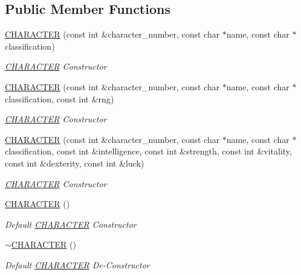 \subsection*{Public Member Functions}
\begin{DoxyCompactItemize}
\item 
\mbox{\hyperlink{class_c_h_a_r_a_c_t_e_r_a443ff58bbda601d4e46619cbc67ee874}{C\+H\+A\+R\+A\+C\+T\+ER}} (const int \&character\+\_\+number, const char $\ast$name, const char $\ast$classification)
\begin{DoxyCompactList}\small\item\em \mbox{\hyperlink{class_c_h_a_r_a_c_t_e_r}{C\+H\+A\+R\+A\+C\+T\+ER}} Constructor \end{DoxyCompactList}\item 
\mbox{\hyperlink{class_c_h_a_r_a_c_t_e_r_a58be3a67ce978215bdef8b0ce7f9e284}{C\+H\+A\+R\+A\+C\+T\+ER}} (const int \&character\+\_\+number, const char $\ast$name, const char $\ast$classification, const int \&rng)
\begin{DoxyCompactList}\small\item\em \mbox{\hyperlink{class_c_h_a_r_a_c_t_e_r}{C\+H\+A\+R\+A\+C\+T\+ER}} Constructor \end{DoxyCompactList}\item 
\mbox{\hyperlink{class_c_h_a_r_a_c_t_e_r_a25c8ab5e21be8f36f7f5403332356055}{C\+H\+A\+R\+A\+C\+T\+ER}} (const int \&character\+\_\+number, const char $\ast$name, const char $\ast$classification, const int \&intelligence, const int \&strength, const int \&vitality, const int \&dexterity, const int \&luck)
\begin{DoxyCompactList}\small\item\em \mbox{\hyperlink{class_c_h_a_r_a_c_t_e_r}{C\+H\+A\+R\+A\+C\+T\+ER}} Constructor \end{DoxyCompactList}\item 
\mbox{\hyperlink{class_c_h_a_r_a_c_t_e_r_af8c0944af8935d153e26ec9e4aa17990}{C\+H\+A\+R\+A\+C\+T\+ER}} ()
\begin{DoxyCompactList}\small\item\em Default \mbox{\hyperlink{class_c_h_a_r_a_c_t_e_r}{C\+H\+A\+R\+A\+C\+T\+ER}} Constructor \end{DoxyCompactList}\item 
\mbox{\hyperlink{class_c_h_a_r_a_c_t_e_r_a46eff965f189ed1c4d61f9f04c93da5d}{$\sim$\+C\+H\+A\+R\+A\+C\+T\+ER}} ()
\begin{DoxyCompactList}\small\item\em Default \mbox{\hyperlink{class_c_h_a_r_a_c_t_e_r}{C\+H\+A\+R\+A\+C\+T\+ER}} De-\/\+Constructor \end{DoxyCompactList}\item 

\end{DoxyCompactItemize}

